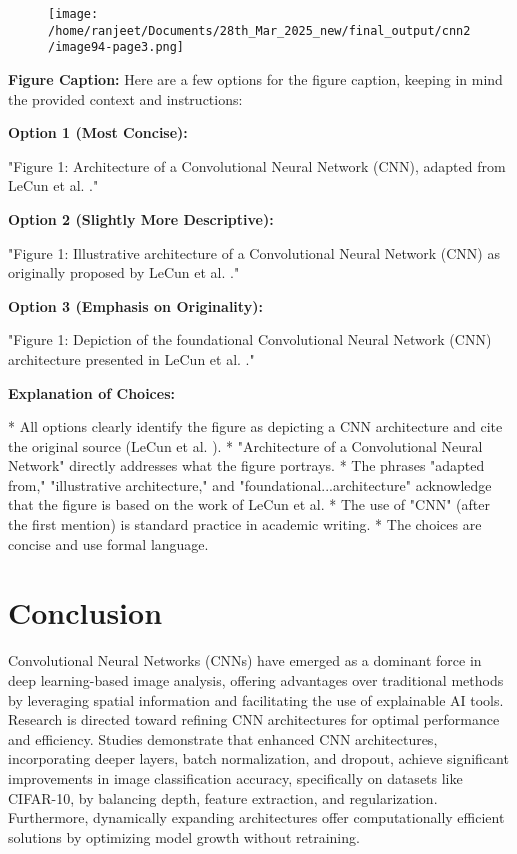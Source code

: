 \documentclass{article}
\begin{document}
\begin{figure}[h]
\centering
\texttt{[image: /home/ranjeet/Documents/28th\_Mar\_2025\_new/final\_output/cnn2/image94-page3.png]}
\end{figure}


\textbf{Figure Caption:} Here are a few options for the figure caption, keeping in mind the provided context and instructions:

\textbf{Option 1 (Most Concise):}

"Figure 1: Architecture of a Convolutional Neural Network (CNN), adapted from LeCun et al. \cite{7}."

\textbf{Option 2 (Slightly More Descriptive):}

"Figure 1: Illustrative architecture of a Convolutional Neural Network (CNN) as originally proposed by LeCun et al. \cite{7}."

\textbf{Option 3 (Emphasis on Originality):}

"Figure 1: Depiction of the foundational Convolutional Neural Network (CNN) architecture presented in LeCun et al. \cite{7}."

\textbf{Explanation of Choices:}

*   All options clearly identify the figure as depicting a CNN architecture and cite the original source (LeCun et al. \cite{7}).
*   "Architecture of a Convolutional Neural Network" directly addresses what the figure portrays.
*   The phrases "adapted from," "illustrative architecture," and "foundational...architecture" acknowledge that the figure is based on the work of LeCun et al.
*   The use of "CNN" (after the first mention) is standard practice in academic writing.
*   The choices are concise and use formal language.


\section*{Conclusion}
Convolutional Neural Networks (CNNs) have emerged as a dominant force in deep learning-based image analysis, offering advantages over traditional methods by leveraging spatial information and facilitating the use of explainable AI tools. Research is directed toward refining CNN architectures for optimal performance and efficiency. Studies demonstrate that enhanced CNN architectures, incorporating deeper layers, batch normalization, and dropout, achieve significant improvements in image classification accuracy, specifically on datasets like CIFAR-10, by balancing depth, feature extraction, and regularization. Furthermore, dynamically expanding architectures offer computationally efficient solutions by optimizing model growth without retraining.
\end{document}
